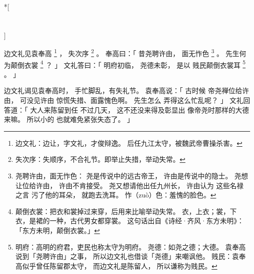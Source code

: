 
\switchcolumn[0]*[\section{}]

边文礼见袁奉高%
\footnote{%
    边文礼：边让，字文礼，才俊辩逸。
            后任九江太守，被魏武帝曹操杀害。
}%
，
失次序%
\footnote{%
    失次序：失顺序，不合礼节。即举止失措，举动失常。
}%
。
奉高曰：「
    昔尧聘许由，
    面无怍色%
    \footnote{%
        尧聘许由，面无怍色：
            尧是传说中的远古帝王，
            许由是传说中的隐士。
            尧想让位给许由，
            许由不肯接受。
            尧又想请他出任九州长，
            许由认为
            这些名禄之言
            污了他的耳朵，
            就跑去洗耳。
        怍（zuò）色：羞愧的脸色。
    }%
    。
    先生何为颠倒衣裳%
    \footnote{%
        颠倒衣裳：把衣和裳掉过来穿，后用来比喻举动失常。
                  衣，上衣；裳，下衣，是裙的一种，古代男女都穿裳。
                  这句话出自《诗经·齐风·东方未明》：
                  「东方未明，颠倒衣裳。」
    }%
    ？
」
文礼答曰：「
    明府初临，
    尧德未彰，
    是以
    贱民颠倒衣裳耳%
    \footnote{%
        明府：高明的府君，吏民也称太守为明府。
        尧德：如尧之德；大德。
              袁奉高说到「尧聘许由」之事，
              所以边文礼也借谈「尧德」来嘲讽他。
        贱民：袁奉高似乎曾任陈留郡太守，
              而边文礼是陈留人，
              所以谦称为贱民。
    }%
    。
」

\switchcolumn

边文礼谒见袁奉高时，
手忙脚乱，有失礼节。
袁奉高说：「
    古时候
    帝尧禅位给许由，
    可没见许由
    惊慌失措、面露愧色啊。
    先生怎么
    弄得这么忙乱呢？
」
文礼回答道：「
    大人来陈留到任
    不过几天，
    这不还没来得及彰显出
    像帝尧时那样的大德来嘛。
    所以小的
    也就难免紧张失态了。
」
